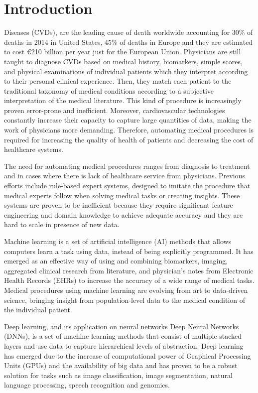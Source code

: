 \documentclass[journal]{IEEEtran}
\begin{document}
\section{Introduction}
\label{sec:introduction}
 Diseases (CVDs), are the leading cause of death worldwide accounting for 30\% of deaths in 2014 in United States\cite{benjamin2017heart}, 45\% of deaths in Europe and they are estimated to cost \euro{210} billion per year just for the European Union\cite{wilkins2017european}.
Physicians are still taught to diagnose CVDs based on medical history, biomarkers, simple scores, and physical examinations of individual patients which they interpret according to their personal clinical experience.
Then, they match each patient to the traditional taxonomy of medical conditions according to a subjective interpretation of the medical literature.
This kind of procedure is increasingly proven error-prone and inefficient.
Moreover, cardiovascular technologies constantly increase their capacity to capture large quantities of data, making the work of physicians more demanding.
Therefore, automating medical procedures is required for increasing the quality of health of patients and decreasing the cost of healthcare systems.

The need for automating medical procedures ranges from diagnosis to treatment and in cases where there is lack of healthcare service from physicians.
Previous efforts include rule-based expert systems, designed to imitate the procedure that medical experts follow when solving medical tasks or creating insights.
These systems are proven to be inefficient because they require significant feature engineering and domain knowledge to achieve adequate accuracy and they are hard to scale in presence of new data.

Machine learning is a set of artificial intelligence (AI) methods that allows computers learn a task using data, instead of being explicitly programmed.
It has emerged as an effective way of using and combining biomarkers, imaging, aggregated clinical research from literature, and physician's notes from Electronic Health Records (EHRs) to increase the accuracy of a wide range of medical tasks.
Medical procedures using machine learning are evolving from art to data-driven science, bringing insight from population-level data to the medical condition of the individual patient.

Deep learning, and its application on neural networks Deep Neural Networks (DNNs), is a set of machine learning methods that consist of multiple stacked layers and use data to capture hierarchical levels of abstraction.
Deep learning has emerged due to the increase of computational power of Graphical Processing Units (GPUs) and the availability of big data and has proven to be a robust solution for tasks such as image classification\cite{krizhevsky2012imagenet}, image segmentation\cite{ronneberger2015u}, natural language processing\cite{collobert2008unified}, speech recognition\cite{graves2013speech} and genomics\cite{alipanahi2015predicting}.
\end{document}
